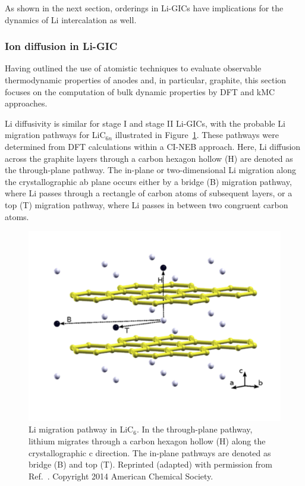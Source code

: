 \documentclass[../main.tex]{subfiles}
\begin{document}
As shown in the next section, orderings in Li-GICs have implications for the dynamics of Li intercalation as well.

\subsubsection{Ion diffusion in Li-GIC} 
\label{sec:anodes_ion_diffusion}

Having outlined the use of atomistic techniques to evaluate observable thermodynamic properties of anodes and, in particular, graphite, this section focuses on the computation of bulk dynamic properties by DFT and kMC approaches.

Li diffusivity is similar for stage I and stage II Li-GICs, \cite{persson2010} with the probable Li migration pathways for LiC$_{6n}$ illustrated in Figure~\ref{fig:Rl}.  \cite{thinius2014theoretical} These pathways were determined from DFT calculations within a CI-NEB approach. Here, Li diffusion across the graphite layers through a carbon hexagon hollow (H) are denoted as the through-plane pathway. The in-plane or two-dimensional Li migration along the crystallographic ab plane occurs either by a bridge (B) migration pathway, where Li passes through a rectangle of carbon atoms of subsequent layers, or a top (T) migration pathway, where Li passes in between two congruent carbon atoms. 

\begin{figure}
    \centering           
    \includegraphics[scale=0.8]{figures/Islam-Fig-LiC6.png}
    \caption{Li migration pathway in LiC$_{6}$. In the through-plane pathway, lithium migrates through a carbon hexagon hollow (H) along the crystallographic c direction. The in-plane pathways are denoted as bridge (B) and top (T). Reprinted (adapted) with permission from Ref.~. Copyright 2014 American Chemical Society.}
    \label{fig:Rl}
\end{figure}
\end{document}
